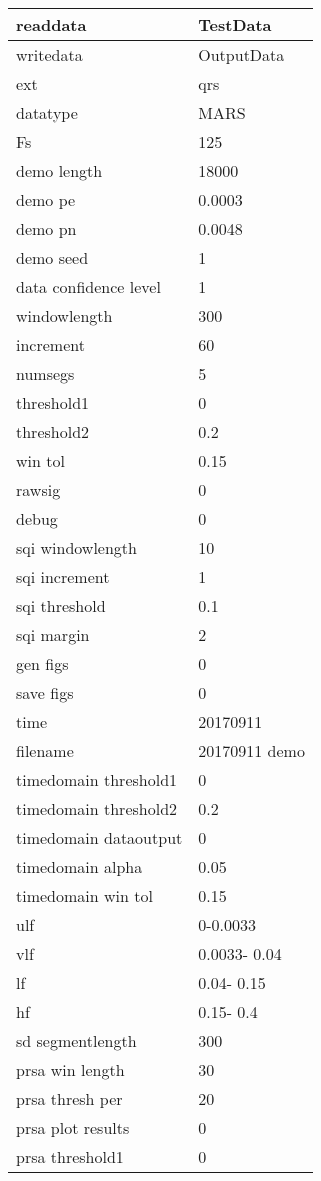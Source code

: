 \begin{tabular}{|l|l|}
\hline
readdata&TestData\\\hline
writedata&OutputData\\\hline
ext&qrs\\\hline
datatype&MARS\\\hline
Fs&125\\\hline
demo length&18000\\\hline
demo pe&0.0003\\\hline
demo pn&0.0048\\\hline
demo seed&1\\\hline
data confidence level&1\\\hline
windowlength&300\\\hline
increment&60\\\hline
numsegs&5\\\hline
threshold1&0\\\hline
threshold2&0.2\\\hline
win tol&0.15\\\hline
rawsig&0\\\hline
debug&0\\\hline
sqi windowlength&10\\\hline
sqi increment&1\\\hline
sqi threshold&0.1\\\hline
sqi margin&2\\\hline
gen figs&0\\\hline
save figs&0\\\hline
time&20170911\\\hline
filename&20170911 demo\\\hline
timedomain threshold1&0\\\hline
timedomain threshold2&0.2\\\hline
timedomain dataoutput&0\\\hline
timedomain alpha&0.05\\\hline
timedomain win tol&0.15\\\hline
ulf&     0-0.0033\\\hline
vlf&0.0033-  0.04\\\hline
lf&  0.04-  0.15\\\hline
hf&  0.15-   0.4\\\hline
sd segmentlength&300\\\hline
prsa win length&30\\\hline
prsa thresh per&20\\\hline
prsa plot results&0\\\hline
prsa threshold1&0\\\hline

\end{tabular}

